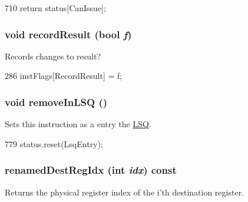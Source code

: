 \begin{DoxyCode}
710 { return status[CanIssue]; }
\end{DoxyCode}
\hypertarget{classBaseDynInst_a2873e4a3f13a6eced648f00776dde834}{
\subsubsection[{recordResult}]{\setlength{\rightskip}{0pt plus 5cm}void recordResult (bool {\em f})}}
\label{classBaseDynInst_a2873e4a3f13a6eced648f00776dde834}
Records changes to result? 


\begin{DoxyCode}
286 { instFlags[RecordResult] = f; }
\end{DoxyCode}
\hypertarget{classBaseDynInst_a464c336cf798d9eec1f4bd8daf601fa5}{
\subsubsection[{removeInLSQ}]{\setlength{\rightskip}{0pt plus 5cm}void removeInLSQ ()}}
\label{classBaseDynInst_a464c336cf798d9eec1f4bd8daf601fa5}
Sets this instruction as a entry the \hyperlink{classLSQ}{LSQ}. 


\begin{DoxyCode}
779 { status.reset(LsqEntry); }
\end{DoxyCode}
\hypertarget{classBaseDynInst_ab7e10290401d7350e965a28388ad29d8}{
\subsubsection[{renamedDestRegIdx}]{ renamedDestRegIdx (int {\em idx}) const}}
\label{classBaseDynInst_ab7e10290401d7350e965a28388ad29d8}
Returns the physical register index of the i'th destination register. 



